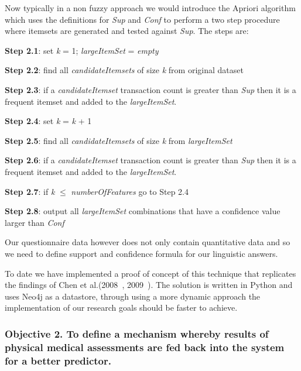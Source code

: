 \noindent
Now typically in a non fuzzy approach we would introduce the Apriori algorithm which uses the
definitions for \textit{Sup} and \textit{Conf} to perform a two step procedure where itemsets are generated and tested against \textit{Sup}. The steps are:

\noindent
\textbf{Step 2.1}: set \textit{k} = 1; \textit{largeItemSet} = \textit{empty}

\noindent
\textbf{Step 2.2}: find all \textit{candidateItemsets} of size \textit{k} from original dataset

\noindent
\textbf{Step 2.3}: if a \textit{candidateItemset} transaction count is greater than \textit{Sup} then it is a frequent itemset and added to the \textit{largeItemSet}.

\noindent
\textbf{Step 2.4}: set \textit{k} = \textit{k} + 1

\noindent
\textbf{Step 2.5}: find all \textit{candidateItemsets} of size \textit{k} from \textit{largeItemSet}

\noindent
\textbf{Step 2.6}: if a \textit{candidateItemset} transaction count is greater than \textit{Sup} then it is a frequent itemset and added to the \textit{largeItemSet}.

\noindent
\textbf{Step 2.7}: if \textit{k} $\leq$ \textit{numberOfFeatures} go to Step 2.4

\noindent
\textbf{Step 2.8}: output all \textit{largeItemSet} combinations that have a confidence value larger than \textit{Conf}

\noindent
Our questionnaire data however does not only contain quantitative data and so we need to define support and confidence formula for our linguistic answers.


To date we have implemented a proof of concept of this technique that replicates the findings of Chen et al.(2008~\cite{chen2008mining}, 2009~\cite{chen2009mining}).
The solution is written in Python and uses Neo4j as a datastore, through using a more dynamic approach the implementation of our research goals should be faster to achieve.


\subsubsection{Objective 2. To define a mechanism whereby results of physical medical assessments are fed back into the system for a better predictor.}

